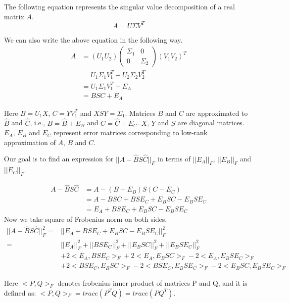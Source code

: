 \documentclass[runningheads]{llncs}
\begin{document}
The following equation represents the singular value decomposition of a real matrix $A$.
\begin{equation*}
A=U\Sigma V^T
\end{equation*}

\noindent We can also write the above equation in the following way.
\begin{align*}
A&=(U_1 U_2)\begin{pmatrix}
\Sigma_1 & 0\\
0 & \Sigma_2
\end{pmatrix}(V_1 V_2)^T\\
&= U_1\Sigma_1 V_1^T + U_2 \Sigma_2 V_2^T\\
&= U_1\Sigma_1 V_1^T + E_A \\
&= BSC + E_A
\end{align*}

\noindent Here $B = U_1 X$, $C=YV_1^T$ and $XSY = \Sigma_1$.  Matrices $B$ and $C$ are approximated to $\hat{B}$ and $\hat{C}$, i.e., $B = \hat{B} + E_B$ and $C = \hat{C} + E_C$. $X$, $Y$ and $S$ are diagonal matrices. $E_A$, $E_B$ and $E_C$ represent error matrices corresponding to low-rank approximation of $A$, $B$ and $C$.

\noindent Our goal is to find an expression for $||A - \hat{B} S \hat{C}||_F$ in terms of $||E_A||_F$, $||E_B||_F$ and $||E_C||_F$.

\begin{align*}
A - \hat{B} S \hat{C} &= A - (B-E_B)S(C-E_C)\\
&= A - BSC + BSE_C +  E_BSC - E_BSE_C\\
&= E_A + BSE_C +  E_BSC - E_BSE_C
\end{align*}
Now we take square of Frobenius norm on both sides,
\begin{align*}
||A - \hat{B} S \hat{C}||_F^2 =& ||E_A + BSE_C +  E_BSC - E_BSE_C||_F^2 \\
=& ||E_A||_F^2 + ||BSE_C||_F^2 + ||E_BSC||_F^2 + ||E_BSE_C||_F^2 \\
& + 2\boldsymbol{<}E_A, BSE_C\boldsymbol{>}_F + 2<E_A, E_BSC>_F -2 <E_A, E_BSE_C>_F\\
& + 2 <BSE_C, E_BSC>_F -2 <BSE_C, E_BSE_C>_F - 2<E_BSC, E_BSE_C>_F
\end{align*}

\noindent Here $<P, Q>_F$ denotes frobenius inner product of matrices P and Q, and it is defined as: $<P, Q>_F = trace(P^TQ) = trace(PQ^T)$.
\end{document}
